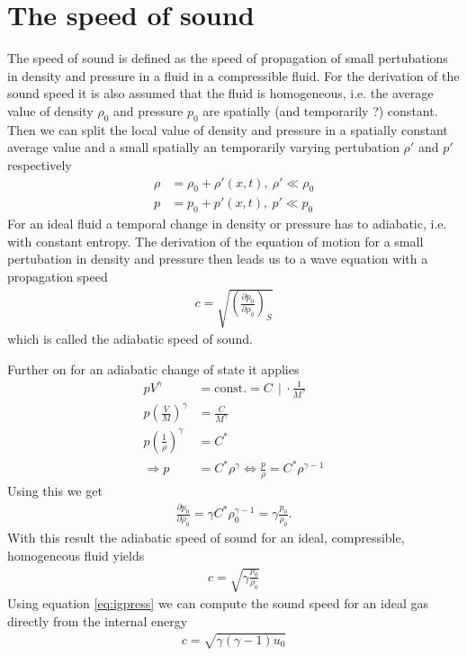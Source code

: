 \documentclass[a4paper,
					12pt,
					twoside,
					openright
					]{book}
\newcommand{\lra}[1]{{ \left( #1 \right) }}
\begin{document}
\chapter{The speed of sound}
The speed of sound is defined as the speed of propagation of small pertubations
in density and pressure in a fluid in a compressible fluid. For the derivation
of the sound speed it is also assumed that the fluid is homogeneous, i.e. the
average value of density $\rho_0$ and pressure $p_0$ are spatially (and
temporarily ?) constant. Then we can split the local value of density and
pressure in a spatially constant average value and a small spatially an
temporarily varying pertubation $\rho'$ and $p'$ respectively
\begin{align}
\rho &= \rho_0 + \rho'(x,t),\ \rho' \ll \rho_0 \\
p &= p_0 + p'(x,t),\ p' \ll p_0
\end{align}
For an ideal fluid a temporal change in density or pressure has to adiabatic,
i.e. with constant entropy. The derivation of the equation of motion for a small
pertubation in density and pressure then leads us to a wave equation with a
propagation speed
\begin{align}
c=\sqrt{\lra{\frac{\partial p_0}{\partial \rho_0}}_S}
\end{align}
which is called the adiabatic speed of sound. 

Further on for an adiabatic change of state it applies
\begin{align}
p V^\gamma &= \text{const.} = C \ \ |\ \cdot\frac{1}{M^\gamma}\\
p \lra{\frac{V}{M}}^\gamma &= \frac{C}{M^\gamma}\\
p \lra{\frac{1}{\rho}}^\gamma &= C^*\\
\Longrightarrow 
p &= C^* \rho^\gamma \Longleftrightarrow \frac{p}{\rho} = C^* \rho^{\gamma-1}
\end{align}
Using this we get
\begin{align}
\frac{\partial p_0}{\partial \rho_0} = \gamma C^* \rho_0^{\gamma-1} 
= \gamma \frac{p_0}{\rho_0}.
\end{align}
With this result the adiabatic speed of sound for an ideal, compressible,
homogeneous fluid yields
\begin{align}
c=\sqrt{\gamma \frac{p_0}{\rho_0}}
\end{align}
Using equation \eqref{eq:igpress} we can compute the sound speed for an ideal gas 
directly from the internal energy
\begin{align}
c=\sqrt{\gamma (\gamma-1) u_0}
\end{align}
\end{document}
